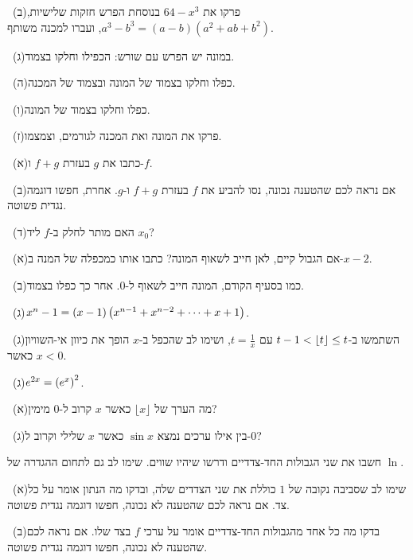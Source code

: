 \documentclass[12pt, a4paper]{article}
\begin{document}
\noindent {}\ (ב)\enskip פרקו את $64-x^3$ בנוסחת הפרש חזקות שלישיות, $a^3-b^3=(a-b)\left(a^2+ab+b^2\right)$, ועברו למכנה משותף.\par\smallskip
\noindent {}\ (ג)\enskip במונה יש הפרש עם שורש: הכפילו וחלקו בצמוד.\par\smallskip
\noindent {}\ (ה)\enskip כפלו וחלקו בצמוד של המונה ובצמוד של המכנה.\par\smallskip
\noindent {}\ (ו)\enskip כפלו וחלקו בצמוד של המונה.\par\smallskip
\noindent {}\ (ז)\enskip פרקו את המונה ואת המכנה לגורמים, וצמצמו.\par\smallskip
\noindent {}\ (א)\enskip כתבו את $g$ בעזרת $f+g$ ו-$f$.\par\smallskip
\noindent {}\ (ב)\enskip אם נראה לכם שהטענה נכונה, נסו להביע את $f$ בעזרת $f+g$ ו-$g$. אחרת, חפשו דוגמה נגדית פשוטה.\par\smallskip
\noindent {}\ (ד)\enskip האם מותר לחלק ב-$f$ ליד $x_0$?\par\smallskip
\noindent {}\ (א)\enskip אם הגבול קיים, לאן חייב לשאוף המונה? כתבו אותו כמכפלה של המנה ב-$x-2$.\par\smallskip
\noindent {}\ (ב)\enskip כמו בסעיף הקודם, המונה חייב לשאוף ל-$0$. אחר כך כפלו בצמוד.\par\smallskip
\noindent {}\ (ג)\enskip $x^n-1=(x-1)\left(x^{n-1}+x^{n-2}+\dots+x+1\right)$.\par\smallskip
\noindent {}\ (ג)\enskip השתמשו ב-$t-1<\left\lfloor t\right\rfloor\le t$ עם $t=\frac1x$, ושימו לב שהכפל ב-$x$ הופך את כיוון אי-השוויון כאשר $x<0$.\par\smallskip
\noindent {}\ (ג)\enskip $e^{2x}=\left(e^x\right)^2$.\par\smallskip
\noindent {}\ (א)\enskip מה הערך של $\lfloor x\rfloor$ כאשר $x$ קרוב ל-$0$ מימין?\par\smallskip
\noindent {}\ (ג)\enskip בין אילו ערכים נמצא $\sin x$ כאשר $x$ שלילי וקרוב ל-$0$?\par\smallskip
\noindent {}\enskip חשבו את שני הגבולות החד-צדדיים ודרשו שיהיו שווים. שימו לב גם לתחום ההגדרה של $\ln$.\par\smallskip
\noindent {}\ (א)\enskip שימו לב שסביבה נקובה של $1$ כוללת את שני הצדדים שלה, ובדקו מה הנתון אומר על כל צד. אם נראה לכם שהטענה לא נכונה, חפשו דוגמה נגדית פשוטה.\par\smallskip
\noindent {}\ (ב)\enskip בדקו מה כל אחד מהגבולות החד-צדדיים אומר על ערכי $f$ בצד שלו. אם נראה לכם שהטענה לא נכונה, חפשו דוגמה נגדית פשוטה.\par\smallskip
\end{document}
